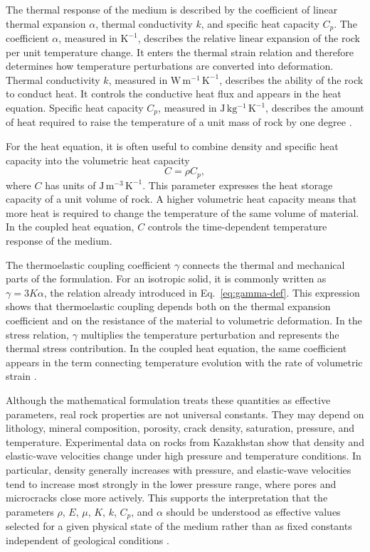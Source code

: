 The thermal response of the medium is described by the coefficient of linear thermal expansion \(\alpha\), thermal conductivity \(k\), and specific heat capacity \(C_p\). The coefficient \(\alpha\), measured in \(\mathrm{K^{-1}}\), describes the relative linear expansion of the rock per unit temperature change. It enters the thermal strain relation and therefore determines how temperature perturbations are converted into deformation. Thermal conductivity \(k\), measured in \(\mathrm{W\,m^{-1}\,K^{-1}}\), describes the ability of the rock to conduct heat. It controls the conductive heat flux and appears in the heat equation. Specific heat capacity \(C_p\), measured in \(\mathrm{J\,kg^{-1}\,K^{-1}}\), describes the amount of heat required to raise the temperature of a unit mass of rock by one degree \cite{robertson1988,turcotte2014}.

For the heat equation, it is often useful to combine density and specific heat capacity into the volumetric heat capacity
\begin{equation}
C = \rho C_p,
\end{equation}
where \(C\) has units of \(\mathrm{J\,m^{-3}\,K^{-1}}\). This parameter expresses the heat storage capacity of a unit volume of rock. A higher volumetric heat capacity means that more heat is required to change the temperature of the same volume of material. In the coupled heat equation, \(C\) controls the time-dependent temperature response of the medium.

The thermoelastic coupling coefficient \(\gamma\) connects the thermal and mechanical parts of the formulation. For an isotropic solid, it is commonly written as $\gamma = 3K\alpha$, the relation already introduced in Eq.~\eqref{eq:gamma-def}.
This expression shows that thermoelastic coupling depends both on the thermal expansion coefficient and on the resistance of the material to volumetric deformation. In the stress relation, \(\gamma\) multiplies the temperature perturbation and represents the thermal stress contribution. In the coupled heat equation, the same coefficient appears in the term connecting temperature evolution with the rate of volumetric strain \cite{boley1960,nowacki1986}.

Although the mathematical formulation treats these quantities as effective parameters, real rock properties are not universal constants. They may depend on lithology, mineral composition, porosity, crack density, saturation, pressure, and temperature. Experimental data on rocks from Kazakhstan show that density and elastic-wave velocities change under high pressure and temperature conditions. In particular, density generally increases with pressure, and elastic-wave velocities tend to increase most strongly in the lower pressure range, where pores and microcracks close more actively. This supports the interpretation that the parameters \(\rho\), \(E\), \(\mu\), \(K\), \(k\), \(C_p\), and \(\alpha\) should be understood as effective values selected for a given physical state of the medium rather than as fixed constants independent of geological conditions \cite{kazakhRockPropertiesHighPT}.

